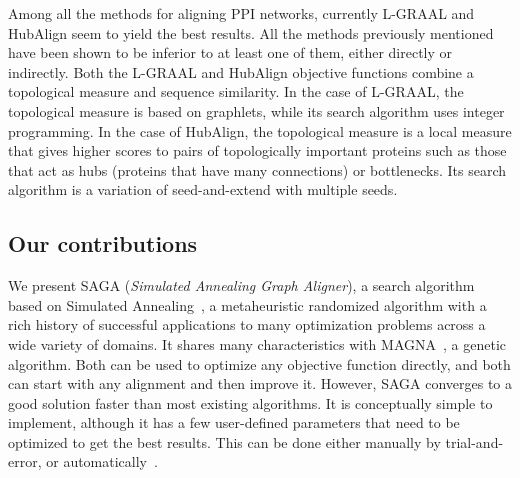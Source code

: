 \documentclass{bioinfo}
\begin{document}
Among all the methods for aligning PPI networks, currently L-GRAAL \citep{LGRAAL} and HubAlign \citep{HubAlign} seem to yield the best results. All the methods previously mentioned have been shown to be inferior to at least one of them, either directly or indirectly. Both the L-GRAAL and HubAlign objective functions combine a topological measure and sequence similarity. In the case of L-GRAAL, the topological measure is based on graphlets, while its search algorithm uses integer programming. In the case of HubAlign, the topological measure is a local measure that gives higher scores to pairs of topologically important proteins such as those that act as hubs (proteins that have many connections) or bottlenecks. Its search algorithm is a variation of seed-and-extend with multiple seeds.

\subsection{Our contributions}

We present SAGA (\textit{Simulated Annealing Graph Aligner}), a search algorithm based on Simulated Annealing~\citep{SA1,SA2}, a metaheuristic randomized algorithm with a rich history of successful applications to many optimization problems across a wide variety of domains.
It shares many characteristics with MAGNA~\citep{MAGNA}, a genetic algorithm. Both can be used to optimize any objective function directly, and both can start with any alignment and then improve it. However, SAGA converges to a good solution faster than most existing algorithms.
It is conceptually simple to implement, although it has a few user-defined parameters that need to be optimized to get the best results. This can be done either manually by trial-and-error, or automatically~\citep{autosa}.
\end{document}
